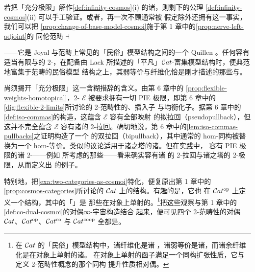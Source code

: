 若把「充分极限」解作\cref{def:infinity-cosmos}(i) 的诸\trLimit，则剩下的公理%
\cref{def:infinity-cosmos}(ii) 可以手工验证。或者，再一次不顾\trModelCategory{}通常被
假定除\trLimit{}外还拥有\trColimit{}这一事实，我们可以把%
\cref{prop:change-of-base-model-cosmoi}施于第 1 章中的\cref{prop:nerve-left-adjoint}的
同伦范畴$\dashv$\trNerve{}\trAdjunction
\begin{center}
\end{center}
——它是 Joyal \trModelStructure{}与范畴上常见的「民俗」模型结构之间的一个 Quillen
\trAdjunction。任何容有适当有限\trLimit{}与\trColimit{}的 $2$-\trCategory，在配备由
Lack \cite{bib72} 所描述的「平凡」$\mathcal{C}at$-富集模型结构时，便典范地富集于范畴的民俗模型
结构之上，其弱等价与纤维化恰是刚才描述的那些\trEquivalence{}与\trIsofibration。

尚须揭开「充分极限」这一含糊措辞的含义。由第 6 章中的%
\cref{prop:flexible-weights-homotopical}，$2$-\trCategory{} $\mathcal{E}$ 被要求拥有一切
PIE 极限，即第 6 章中的\cref{dig:flexible-2-limits}所讨论的 2-范畴性的\trProduct、插入子
与均衡化子。据第 6 章中的\cref{def:iso-commas}的构造，这蕴含 $\mathcal{E}$ 容有全部映射
的拟拉回（pseudopullback），但这并不完全蕴含 $\mathcal{E}$ 容有诸\trIsofibration{}的
2-拉回。确切地说，第 6 章中的\cref{lem:iso-commas-pullbacks}之证明构造了一个%
\trIsofibration{}的双拉回（bipullback），其中通常的 hom-\trCategory{}同构被替换为一个
hom-\trCategory{}等价。类似的议论适用于诸\trIsofibration{}之塔的诸\trLimit。但在实践中，
容有 PIE 极限的诸 $2$-\trCategory——例如 \cite{bib18} 所考虑的那些——看来确实容有诸%
\trIsofibration{}的 2-拉回与诸\trIsofibration{}之塔的 2-极限，从而定义出\trInfinityCosmos
的例子。

特别地，把\cref{exa:two-categories-as-cosmoi}特化，便复原出第 1 章中的%
\cref{prop:cosmos-categories}所讨论的 $\mathcal{C}at$ 上的\trInfinityCosmos{}结构。有趣的是，它也
在 $\mathcal{C}at^{\mathrm{op}}$ 上定义一个\trInfinityCosmos{}结构，其中的「\trIsofibration」是
那些在对象上单射的\trFunctor。\footnote{在 $\mathcal{C}at$ 的「民俗」模型结构中，诸纤维化是诸%
\trIsofibration，诸弱等价是诸\trEquivalence，而诸余纤维化是在对象上单射的诸\trFunctor。
在对象上单射的函子满足一个同构扩张性质，它与定义 2-范畴性\trIsofibration{}概念的那个同构
提升性质相对偶。}把这些观察与第 1 章中的\cref{def:co-dual-cosmoi}的对偶∞-宇宙构造结合
起来，便可见四个 2-范畴性的对偶 $\mathcal{C}at$、$\mathcal{C}at^{\mathrm{op}}$、$\mathcal{C}at^{\mathrm{co}}$ 与
$\mathcal{C}at^{\mathrm{coop}}$ 全都是\trInfinityCosmos。

